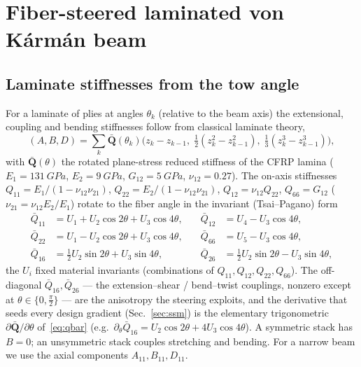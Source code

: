 \documentclass[11pt]{article}
\begin{document}
\section{Fiber-steered laminated von K\'arm\'an beam}\label{sec:beam}

\subsection{Laminate stiffnesses from the tow angle}
For a laminate of plies at angles $\theta_k$ (relative to the beam axis) the
extensional, coupling and bending stiffnesses follow from classical laminate
theory,
\begin{equation}
(A,B,D)=\sum_k \bar{\bm Q}(\theta_k)\Big(z_k-z_{k-1},\;\tfrac12(z_k^2-z_{k-1}^2),\;
\tfrac13(z_k^3-z_{k-1}^3)\Big),
\end{equation}
with $\bar{\bm Q}(\theta)$ the rotated plane-stress reduced stiffness of the
CFRP lamina ($E_1=\SI{131}{GPa}$, $E_2=\SI{9}{GPa}$, $G_{12}=\SI{5}{GPa}$,
$\nu_{12}=0.27$). The on-axis stiffnesses $Q_{11}=E_1/(1-\nu_{12}\nu_{21})$,
$Q_{22}=E_2/(1-\nu_{12}\nu_{21})$, $Q_{12}=\nu_{12}Q_{22}$, $Q_{66}=G_{12}$
($\nu_{21}=\nu_{12}E_2/E_1$) rotate to the fiber angle in the invariant (Tsai--Pagano)
form
\begin{equation}
\begin{aligned}
\bar Q_{11}&=U_1+U_2\cos2\theta+U_3\cos4\theta, &\quad
\bar Q_{12}&=U_4-U_3\cos4\theta,\\
\bar Q_{22}&=U_1-U_2\cos2\theta+U_3\cos4\theta, &\quad
\bar Q_{66}&=U_5-U_3\cos4\theta,\\
\bar Q_{16}&=\tfrac12U_2\sin2\theta+U_3\sin4\theta, &\quad
\bar Q_{26}&=\tfrac12U_2\sin2\theta-U_3\sin4\theta,
\end{aligned}
\label{eq:qbar}
\end{equation}
the $U_i$ fixed material invariants (combinations of $Q_{11},Q_{12},Q_{22},Q_{66}$). The
off-diagonal $\bar Q_{16},\bar Q_{26}$ --- the extension--shear / bend--twist couplings,
nonzero except at $\theta\in\{0,\tfrac{\pi}{2}\}$ --- are the anisotropy the steering
exploits, and the derivative that seeds every design gradient (Sec.~\ref{sec:ssm}) is the
elementary trigonometric $\partial\bar{\bm Q}/\partial\theta$ of~\eqref{eq:qbar}
(e.g.\ $\partial_\theta\bar Q_{16}=U_2\cos2\theta+4U_3\cos4\theta$). A symmetric stack has
$B=0$; an unsymmetric stack couples stretching and bending. For a narrow beam we use the
axial components $A_{11},B_{11},D_{11}$.
\end{document}
